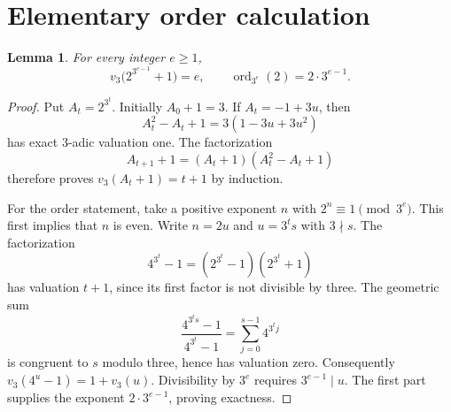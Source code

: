 \documentclass[11pt,a4paper]{article}
\newtheorem{lemma}[theorem]{Lemma}
\theoremstyle{definition}
\theoremstyle{remark}
\DeclareMathOperator{\ord}{ord}
\begin{document}
\section{Elementary order calculation}
\begin{lemma}\label{lem:order}
For every integer $e\ge1$,
\[
 v_3\bigl(2^{3^{e-1}}+1\bigr)=e,
 \qquad \ord_{3^e}(2)=2\cdot3^{e-1}.
\]
\end{lemma}
\begin{proof}
Put $A_t=2^{3^t}$. Initially $A_0+1=3$. If $A_t=-1+3u$, then
\[
 A_t^2-A_t+1=3(1-3u+3u^2)
\]
has exact $3$-adic valuation one. The factorization
\[
 A_{t+1}+1=(A_t+1)(A_t^2-A_t+1)
\]
therefore proves $v_3(A_t+1)=t+1$ by induction.

For the order statement, take a positive exponent $n$ with
$2^n\equiv1\pmod{3^e}$. This first implies that $n$ is
even. Write $n=2u$ and $u=3^t s$ with $3\nmid s$. The factorization
\[
 4^{3^t}-1=(2^{3^t}-1)(2^{3^t}+1)
\]
has valuation $t+1$, since its first factor is not divisible by three.
The geometric sum
\[
 \frac{4^{3^t s}-1}{4^{3^t}-1}
   =\sum_{j=0}^{s-1}4^{3^t j}
\]
is congruent to $s$ modulo three, hence has valuation zero. Consequently
$v_3(4^u-1)=1+v_3(u)$. Divisibility by $3^e$ requires $3^{e-1}\mid u$.
The first part supplies the exponent $2\cdot3^{e-1}$, proving exactness.
\end{proof}
\end{document}
